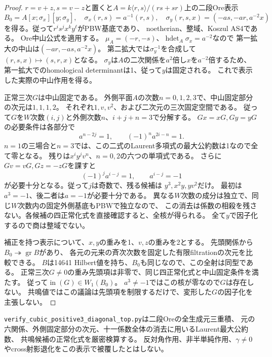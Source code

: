 \begin{proof}
$r=v+z,s=v-z$と置くと$A=k\langle r,s\rangle/(rs+sr)$上の二段Ore表示
\[
 B_0=A[x;\sigma_x][y;\sigma_y],\quad
 \sigma_x(r,s)=a^{-1}(r,s),\quad
 \sigma_y(r,s,x)=(-as,-ar,a^{-2}x)
\]
を得る。従って$r^is^jx^ky^\ell$がPBW基底であり、
noetherian、整域、Koszul AS4である。
Ore中山公式\cite[Theorem 3.3]{LWWOre}を適用する。
$\mu_A=(-r,-s)$、$\operatorname{hdet}_A\sigma_x=a^{-2}$なので
第一拡大の中山は$(-ar,-as,a^{-2}x)$。
第二拡大では$\sigma_y^{-1}$を合成して$(r,s,x)\mapsto(s,r,x)$となる。
$\sigma_y$は$A$の二次関係を$a^2$倍し$x$を$a^{-2}$倍するため、
第一拡大でのhomological determinantは1、従って$y$は固定される。
これで表示した実際の中山作用を得る。

正常三次$G$は中山固定である。
外側平面$A$の次数$n=0,1,2,3$で、中山固定部分の次元は$1,1,1,2$。
それぞれ$1,v,v^2$、および二次元の三次固定空間である。
従って$G$を$W$次数$(i,j)$と外側次数$n$、$i+j+n=3$で分解する。
$Gx=xG,Gy=yG$の必要条件は各部分で
\[
 a^{n-2j}=1,\qquad (-1)^n a^{2i-n}=1.
\]
$n=1$の三場合と$n=3$では、この二式のLaurent多項式の最大公約数は1なので全て零となる。
残りは$x^iy^jv^n$、$n=0,2$の六つの単項式である。
さらに$Gv=vG,Gz=-zG$を課すと
\[
 (-1)^j a^{i-j}=1,\qquad a^{i-j}=-1
\]
が必要十分となる。従って$j$は奇数で、残る候補は
$y^3,x^2y,yv^2$だけ。
最初は$a^3=-1$、後二者は$a=-1$が必要十分である。
異なる$W$次数の成分は独立で、同じ$W$次数内の固定外側基底もPBWで独立なので、
この消去は係数の相殺を残さない。各候補の四正常化式を直接確認すると、全核が得られる。
全て$y$で因子化するので商は整域でない。

補正を持つ表示について、$x,y$の重みを1、$v,z$の重みを2とする。
先頭関係から$B_0\twoheadrightarrow\operatorname{gr}B$があり、
各元の元来の斉次次数を固定した有限filtrationの次元を比較できる。
$B$は14641 Hilbert値を持ち、$B_0$も同じなので、この全射は同型である。
正常三次$G\ne0$の重み先頭項は非零で、同じ四正常化式と中山固定条件を満たす。
従って$\operatorname{in}(G)\in W_1(B_0)$。
$a^3\ne-1$ではこの核が零なので$G$は存在しない。
共鳴値ではこの議論は先頭項を制限するだけで、変形した$G$の因子化を主張しない。
\end{proof}

\texttt{verify\_cubic\_positive3\_diagonal\_top.py}は二段Oreの全生成元三重積、
元の六関係、外側固定部分の次元、十一係数全体の消去に用いるLaurent最大公約数、
共鳴候補の正常化式を厳密検算する。
反対角作用、非半単純作用、$\gamma\ne0$やcross射影退化をこの表示で被覆したとはしない。

